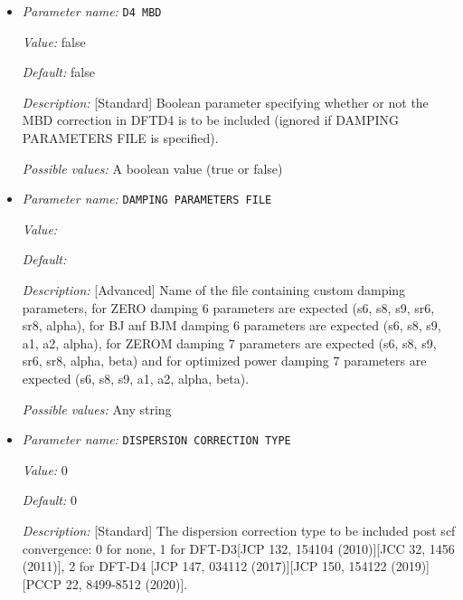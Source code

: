 \begin{itemize}
{\it Possible values:} An integer $n$ such that $0\leq n \leq 4$
\item {\it Parameter name:} {\tt D4 MBD}
\label{parameters:DFT functional parameters/Dispersion Correction/D4 MBD}
\label{parameters:DFT_20functional_20parameters/Dispersion_20Correction/D4_20MBD}


{\it Value:} false


{\it Default:} false


{\it Description:} [Standard] Boolean parameter specifying whether or not the MBD correction in DFTD4 is to be included (ignored if DAMPING PARAMETERS FILE is specified).


{\it Possible values:} A boolean value (true or false)
\item {\it Parameter name:} {\tt DAMPING PARAMETERS FILE}
\label{parameters:DFT functional parameters/Dispersion Correction/DAMPING PARAMETERS FILE}
\label{parameters:DFT_20functional_20parameters/Dispersion_20Correction/DAMPING_20PARAMETERS_20FILE}


{\it Value:} 


{\it Default:} 


{\it Description:} [Advanced] Name of the file containing custom damping parameters, for ZERO damping 6 parameters are expected (s6, s8, s9, sr6, sr8, alpha), for BJ anf BJM damping 6 parameters are expected (s6, s8, s9, a1, a2, alpha), for ZEROM damping 7 parameters are expected (s6, s8, s9, sr6, sr8, alpha, beta) and for optimized power damping 7 parameters are expected (s6, s8, s9, a1, a2, alpha, beta).


{\it Possible values:} Any string
\item {\it Parameter name:} {\tt DISPERSION CORRECTION TYPE}
\label{parameters:DFT functional parameters/Dispersion Correction/DISPERSION CORRECTION TYPE}
\label{parameters:DFT_20functional_20parameters/Dispersion_20Correction/DISPERSION_20CORRECTION_20TYPE}


{\it Value:} 0


{\it Default:} 0


{\it Description:} [Standard] The dispersion correction type to be included post scf convergence: 0 for none, 1 for DFT-D3[JCP 132, 154104 (2010)][JCC 32, 1456 (2011)], 2 for DFT-D4 [JCP 147, 034112 (2017)][JCP 150, 154122 (2019)][PCCP 22, 8499-8512 (2020)].



\end{itemize}
